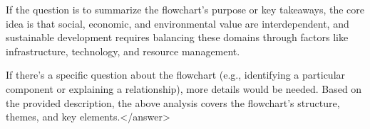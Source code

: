 If the question is to summarize the flowchart’s purpose or key takeaways, the core idea is that social, economic, and environmental value are interdependent, and sustainable development requires balancing these domains through factors like infrastructure, technology, and resource management.  

If there’s a specific question about the flowchart (e.g., identifying a particular component or explaining a relationship), more details would be needed. Based on the provided description, the above analysis covers the flowchart’s structure, themes, and key elements.</answer>